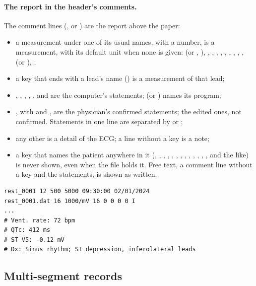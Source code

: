 \paragraph{The report in the header's comments.} The comment lines (, or
) are the report above the paper:
\begin{itemize}
\item a measurement under one of its usual names, with a number, is a measurement, with its
  default unit when none is given:  (or , ),
  , , , , , , ,
  , ,  (or ), ;
\item a key that ends with a lead's name () is a measurement of that lead;
\item {}, , , , ,
   and  are the computer's statements;  (or
  ) names its program;
\item {}, with  and , are the physician's
  confirmed statements;  the edited ones, not confirmed. Statements in one line
  are separated by \code{;} or \code{|};
\item any other  is a detail of the ECG; a line without a key is a note;
\item a key that names the patient anywhere in it (, ,
  , , , ,
  , , , , ,
  , ,  and the like) is never shown, even when the file holds
  it. Free text, a comment line without a key and the statements, is shown as written.
\end{itemize}

\begin{lstlisting}[style=text]
rest_0001 12 500 5000 09:30:00 02/01/2024
rest_0001.dat 16 1000/mV 16 0 0 0 0 I
...
# Vent. rate: 72 bpm
# QTc: 412 ms
# ST V5: -0.12 mV
# Dx: Sinus rhythm; ST depression, inferolateral leads
\end{lstlisting}

\subsection{Multi-segment records}
\label{sec:ecg-viewer-multisegment}

